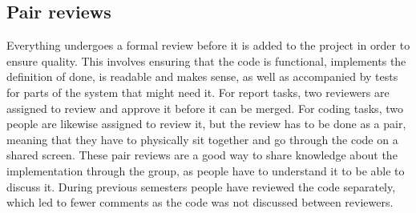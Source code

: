 \subsection{Pair reviews}
Everything undergoes a formal review before it is added to the project in order to ensure quality.
This involves ensuring that the code is functional, implements the definition of done, is readable and makes sense, as well as accompanied by tests for parts of the system that might need it.
For report tasks, two reviewers are assigned to review and approve it before it can be merged.
For coding tasks, two people are likewise assigned to review it, but the review has to be done as a pair, meaning that they have to physically sit together and go through the code on a shared screen.
These pair reviews are a good way to share knowledge about the implementation through the group, as people have to understand it to be able to discuss it.
During previous semesters people have reviewed the code separately, which led to fewer comments as the code was not discussed between reviewers.
